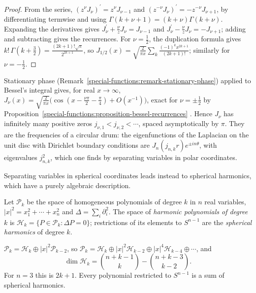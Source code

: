 \begin{proof}
From the series, $(z^\nu J_\nu)^{\prime} = z^\nu J_{\nu-1}$ and $(z^{-\nu}J_\nu)^{\prime} = -z^{-\nu}J_{\nu+1}$, by differentiating termwise and using $\Gamma(k + \nu + 1) = (k + \nu)\Gamma(k + \nu)$. Expanding the derivatives gives
$J_\nu^{\prime} + \frac\nu zJ_\nu = J_{\nu-1}$ and $J_\nu^{\prime} - \frac\nu zJ_\nu = -J_{\nu+1}$; adding and subtracting gives the recurrences. For $\nu = \frac12$, the duplication formula gives
$k!\,\Gamma(k + \frac32) = \frac{(2k + 1)!\sqrt{\pi}}{2^{2k+1}}$, so $J_{1/2}(x) = \sqrt{\frac{2}{\pi x}}\sum_k\frac{(-1)^kx^{2k+1}}{(2k + 1)!}$; similarly for $\nu = -\frac12$.
\end{proof}

\begin{remark}\label{special-functions:remark-bessel-asymptotics}
Stationary phase (Remark~\ref{special-functions:remark-stationary-phase}) applied to Bessel's integral gives, for real $x \to \infty$,
$J_\nu(x) = \sqrt{\frac{2}{\pi x}}\bigl(\cos(x - \frac{\nu\pi}{2} - \frac\pi4) + O(x^{-1})\bigr)$, exact for $\nu = \pm\frac12$ by Proposition~\ref{special-functions:proposition-bessel-recurrences} \cite{watson-bessel}. Hence $J_\nu$ has
infinitely many positive zeros $j_{\nu,1} < j_{\nu,2} < \cdots$, spaced asymptotically by $\pi$. They are the frequencies of a circular drum: the eigenfunctions of the Laplacian on the unit disc with Dirichlet boundary
conditions are $J_n(j_{n,k}r)e^{\pm in\theta}$, with eigenvalues $j_{n,k}^2$, which one finds by separating variables in polar coordinates.
\end{remark}

Separating variables in spherical coordinates leads instead to spherical harmonics, which have a purely algebraic description.

\begin{definition}\label{special-functions:definition-harmonic-polynomials}
Let $\mathcal{P}_k$ be the space of homogeneous polynomials of degree $k$ in $n$ real variables, $|x|^2 = x_1^2 + \cdots + x_n^2$ and $\Delta = \sum_i\partial_i^2$. The space of \emph{harmonic polynomials of degree $k$}
is $\mathcal{H}_k = \{P \in \mathcal{P}_k : \Delta P = 0\}$; restrictions of its elements to $S^{n-1}$ are the \emph{spherical harmonics} of degree $k$.
\end{definition}

\begin{theorem}\label{special-functions:theorem-harmonic-decomposition}
$\mathcal{P}_k = \mathcal{H}_k \oplus |x|^2\mathcal{P}_{k-2}$, so $\mathcal{P}_k = \mathcal{H}_k \oplus |x|^2\mathcal{H}_{k-2} \oplus |x|^4\mathcal{H}_{k-4} \oplus \cdots$, and
\[
\dim\mathcal{H}_k = \binom{n + k - 1}{k} - \binom{n + k - 3}{k - 2}.
\]
For $n = 3$ this is $2k + 1$. Every polynomial restricted to $S^{n-1}$ is a sum of spherical harmonics.
\end{theorem}

